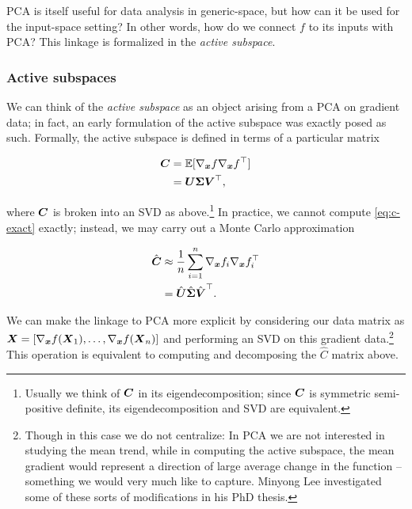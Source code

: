 \documentclass{article}
\begin{document}
PCA is itself useful for data analysis in generic-space, but how can it be used
for the input-space setting? In other words, how do we connect $f$ to its inputs
with PCA? This linkage is formalized in the \emph{active subspace}.

\subsubsection{Active subspaces}
We can think of the \emph{active subspace} as an object arising from a PCA on
gradient data; in fact, an early formulation of the active subspace was exactly
posed as such.\cite{russi2010uncertainty} Formally, the active
subspace\cite{constantine2015} is defined in terms of a particular matrix

\begin{equation} \begin{aligned} \label{eq:c-exact}
    \boldsymbol{C} &= \mathbb{E}[\nabla_{\boldsymbol{x}}f\nabla_{\boldsymbol{x}}f^{\top}] \\
        &= \boldsymbol{U}\boldsymbol{\Sigma}\boldsymbol{V}^{\top},
\end{aligned} \end{equation}

\noindent where $\boldsymbol{C}$ is broken into an SVD as above.\footnote{Usually we think
  of $\boldsymbol{C}$ in its eigendecomposition; since $\boldsymbol{C}$ is symmetric semi-positive
  definite, its eigendecomposition and SVD are equivalent.} In practice, we
cannot compute \eqref{eq:c-exact} exactly; instead, we may carry out a Monte
Carlo approximation

\begin{equation} \begin{aligned} \label{eq:c-monte-carlo}
  \hat{\boldsymbol{C}} &\approx \frac{1}{n}\sum_{i=1}^n \nabla_{\boldsymbol{x}}f_i\nabla_{\boldsymbol{x}}f^{\top}_i \\
            &= \hat{\boldsymbol{U}}\hat{\boldsymbol{\Sigma}}\hat{\boldsymbol{V}}^{\top}.
\end{aligned} \end{equation}

\noindent We can make the linkage to PCA more explicit by considering our data
matrix as $\boldsymbol{X} = [\nabla_{\boldsymbol{x}}f(\boldsymbol{X}_1), \dots, \nabla_{\boldsymbol{x}}f(\boldsymbol{X}_n)]$ and
performing an SVD on this gradient data.\footnote{Though in this case we do not
  centralize: In PCA we are not interested in studying the mean trend, while in
  computing the active subspace, the mean gradient would represent a direction
  of large average change in the function -- something we would very much like
  to capture. Minyong Lee investigated some of these sorts of modifications in
  his PhD thesis.\cite{lee2017prediction}} This operation is equivalent to
computing and decomposing the $\hat{C}$ matrix above.
\end{document}
